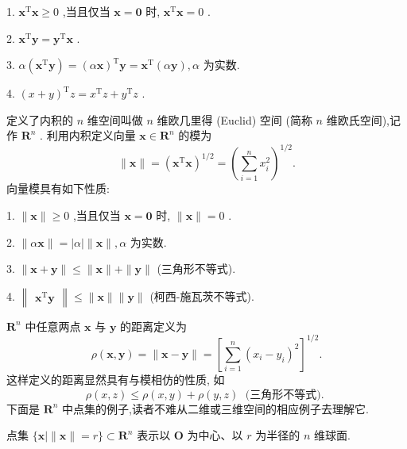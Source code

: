 1. \({\mathbf{x}}^{\mathrm{T}}\mathbf{x} \geq  0\) ,当且仅当 \(\mathbf{x} = \mathbf{0}\) 时, \({\mathbf{x}}^{\mathrm{T}}\mathbf{x} = 0\) .

2. \({\mathbf{x}}^{\mathrm{T}}\mathbf{y} = {\mathbf{y}}^{\mathrm{T}}\mathbf{x}\) .

3. \(\alpha \left( {{\mathbf{x}}^{\mathrm{T}}\mathbf{y}}\right)  = {\left( \alpha \mathbf{x}\right) }^{\mathrm{T}}\mathbf{y} = {\mathbf{x}}^{\mathrm{T}}\left( {\alpha \mathbf{y}}\right) ,\alpha\) 为实数.

4. \({\left( x + y\right) }^{\mathrm{T}}z = {x}^{\mathrm{T}}z + {y}^{\mathrm{T}}z\) .

定义了内积的 \(n\) 维空间叫做 \(n\) 维欧几里得 (Euclid) 空间 (简称 \(n\) 维欧氏空间),记作 \({\mathbf{R}}^{n}\) . 利用内积定义向量 \(\mathbf{x} \in  {\mathbf{R}}^{n}\) 的模为
\[
\parallel \mathbf{x}\parallel  = {\left( {\mathbf{x}}^{\mathrm{T}}\mathbf{x}\right) }^{1/2} = {\left( \mathop{\sum }\limits_{{i = 1}}^{n}{x}_{i}^{2}\right) }^{1/2}. \tag{2}
\]
向量模具有如下性质:

1. \(\parallel \mathbf{x}\parallel  \geq  0\) ,当且仅当 \(\mathbf{x} = \mathbf{0}\) 时, \(\parallel \mathbf{x}\parallel  = 0\) .

2. \(\parallel \alpha \mathbf{x}\parallel  = \left| \alpha \right| \parallel \mathbf{x}\parallel ,\alpha\) 为实数.

3. \(\parallel \mathbf{x} + \mathbf{y}\parallel  \leq  \parallel \mathbf{x}\parallel  + \parallel \mathbf{y}\parallel\) (三角形不等式).

4. \(\begin{Vmatrix}{{\mathbf{x}}^{\mathrm{T}}\mathbf{y}}\end{Vmatrix} \leq  \parallel \mathbf{x}\parallel \parallel \mathbf{y}\parallel\) (柯西-施瓦茨不等式).

\({\mathbf{R}}^{n}\) 中任意两点 \(\mathbf{x}\) 与 \(\mathbf{y}\) 的距离定义为
\[
\rho \left( {\mathbf{x},\mathbf{y}}\right)  = \parallel \mathbf{x} - \mathbf{y}\parallel  = {\left\lbrack  \mathop{\sum }\limits_{{i = 1}}^{n}{\left( {x}_{i} - {y}_{i}\right) }^{2}\right\rbrack  }^{1/2}. \tag{3}
\]
这样定义的距离显然具有与模相仿的性质, 如
\[
\rho \left( {x,z}\right)  \leq  \rho \left( {x,y}\right)  + \rho \left( {y,z}\right) \;\text{ (三角形不等式). }
\]
下面是 \({\mathbf{R}}^{n}\) 中点集的例子,读者不难从二维或三维空间的相应例子去理解它.

点集 \(\{ \mathbf{x} \mid  \parallel \mathbf{x}\parallel  = r\}  \subset  {\mathbf{R}}^{n}\) 表示以 \(\mathbf{O}\) 为中心、以 \(r\) 为半径的 \(n\) 维球面.

